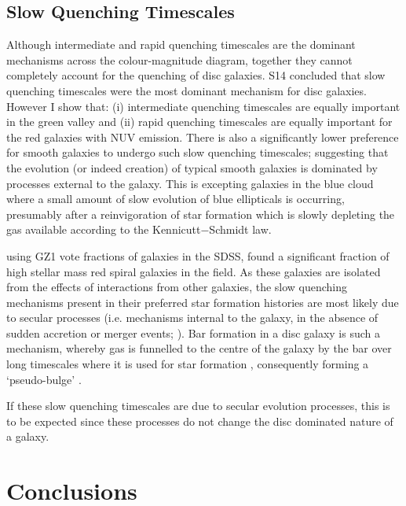 \subsection{Slow Quenching Timescales}\label{slow}
Although intermediate and rapid quenching timescales are the dominant mechanisms across the colour-magnitude diagram, together they cannot completely account for the quenching of disc galaxies. S14 concluded that slow quenching timescales were the most dominant mechanism for disc galaxies. However I show that: (i) intermediate quenching timescales are equally important in the green valley and (ii) rapid quenching timescales are equally important for the red galaxies with NUV emission. There is also a significantly lower preference for smooth galaxies to undergo such slow quenching timescales; suggesting that the evolution (or indeed creation) of typical smooth galaxies is dominated by processes external to the galaxy. This is excepting galaxies in the blue cloud where a small amount of slow evolution of blue ellipticals is occurring, presumably after a reinvigoration of star formation which is slowly depleting the gas available according to the Kennicutt$-$Schmidt law.

\citet{Bamford09} using GZ1 vote fractions of galaxies in the SDSS, found a significant fraction of high stellar mass red spiral galaxies in the field. As these galaxies are isolated from the effects of interactions from other galaxies, the slow quenching mechanisms present in their preferred star formation histories are most likely due to secular processes (i.e. mechanisms internal to the galaxy, in the absence of sudden accretion or merger events; \citealt{kormendy04, Sheth12}). Bar formation in a disc galaxy is such a mechanism, whereby gas is funnelled to the centre of the galaxy by the bar over long timescales where it is used for star formation \citep{masters12a, saintonge12, Cheung13}, consequently forming a `pseudo-bulge' \citep{Kormendy10, Simmons13}.

If these slow quenching timescales are due to secular evolution processes, this is to be expected since these processes do not change the disc dominated nature of a galaxy. 

\section{Conclusions}\label{morph:conc}

